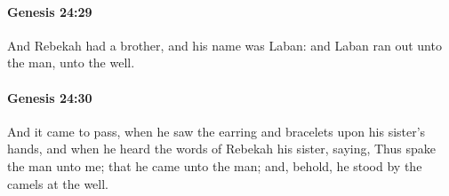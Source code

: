 		\paragraph{Genesis 24:29} %
			\label{GENESIS-24-29}

			And Rebekah had a brother, and his name was Laban: and Laban ran out unto the man, unto the well.


		\paragraph{Genesis 24:30} %
			\label{GENESIS-24-30}

			And it came to pass, when he saw the earring and bracelets upon his sister's hands, and when he heard the words of Rebekah his sister, saying, Thus spake the man unto me; that he came unto the man; and, behold, he stood by the camels at the well.


